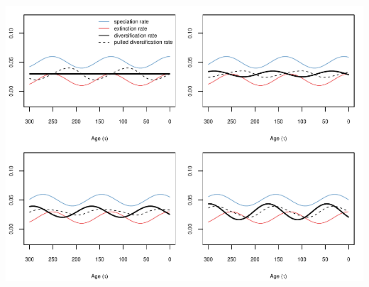 \documentclass[
]{article}
\begin{document}
\includegraphics{supplement_files/figure-latex/unnamed-chunk-25-1.pdf}
\end{document}
